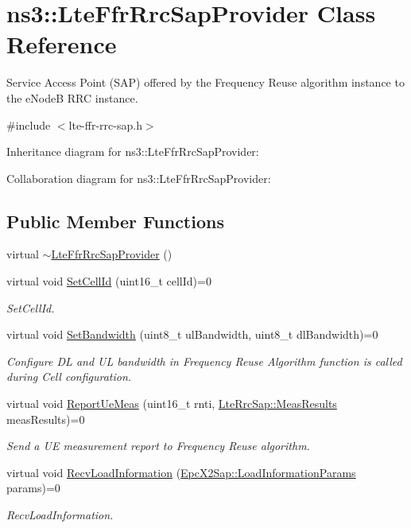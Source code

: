 \hypertarget{classns3_1_1LteFfrRrcSapProvider}{}\section{ns3\+:\+:Lte\+Ffr\+Rrc\+Sap\+Provider Class Reference}
\label{classns3_1_1LteFfrRrcSapProvider}


Service Access Point (S\+AP) offered by the Frequency Reuse algorithm instance to the e\+NodeB R\+RC instance.  




{\ttfamily \#include $<$lte-\/ffr-\/rrc-\/sap.\+h$>$}



Inheritance diagram for ns3\+:\+:Lte\+Ffr\+Rrc\+Sap\+Provider\+:


Collaboration diagram for ns3\+:\+:Lte\+Ffr\+Rrc\+Sap\+Provider\+:
\subsection*{Public Member Functions}
\begin{DoxyCompactItemize}
\item 
virtual \hyperlink{classns3_1_1LteFfrRrcSapProvider_ad4a8750fb96438e3bf3f09d7e254a17a}{$\sim$\+Lte\+Ffr\+Rrc\+Sap\+Provider} ()
\item 
virtual void \hyperlink{classns3_1_1LteFfrRrcSapProvider_a24b6f1ae29046f1d61f74fbd8bbfd5de}{Set\+Cell\+Id} (uint16\+\_\+t cell\+Id)=0
\begin{DoxyCompactList}\small\item\em Set\+Cell\+Id. \end{DoxyCompactList}\item 
virtual void \hyperlink{classns3_1_1LteFfrRrcSapProvider_a6bc210245eab8838adb56297112752f3}{Set\+Bandwidth} (uint8\+\_\+t ul\+Bandwidth, uint8\+\_\+t dl\+Bandwidth)=0
\begin{DoxyCompactList}\small\item\em Configure DL and UL bandwidth in Frequency Reuse Algorithm function is called during Cell configuration. \end{DoxyCompactList}\item 
virtual void \hyperlink{classns3_1_1LteFfrRrcSapProvider_aefa0779641b8432a7d3406b519ca7e59}{Report\+Ue\+Meas} (uint16\+\_\+t rnti, \hyperlink{structns3_1_1LteRrcSap_1_1MeasResults}{Lte\+Rrc\+Sap\+::\+Meas\+Results} meas\+Results)=0
\begin{DoxyCompactList}\small\item\em Send a UE measurement report to Frequency Reuse algorithm. \end{DoxyCompactList}\item 
virtual void \hyperlink{classns3_1_1LteFfrRrcSapProvider_a09016230334da83edd266bc9a441515f}{Recv\+Load\+Information} (\hyperlink{structns3_1_1EpcX2Sap_1_1LoadInformationParams}{Epc\+X2\+Sap\+::\+Load\+Information\+Params} params)=0
\begin{DoxyCompactList}\small\item\em Recv\+Load\+Information. \end{DoxyCompactList}\end{DoxyCompactItemize}


